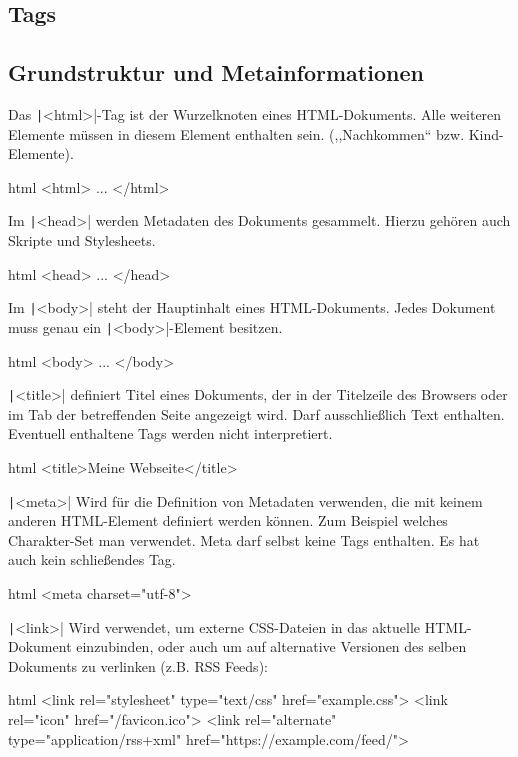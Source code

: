 \documentclass[10pt,a4paper]{article}
\begin{document}
\begin{multicols}{3}
\section*{Tags}
\subsection*{Grundstruktur und Metainformationen}
Das \texttt|<html>|-Tag ist der Wurzelknoten eines HTML-Dokuments. Alle weiteren Elemente müssen in diesem Element enthalten sein. (,,Nachkommen`` bzw. Kind-Elemente).
\begin{codebox}{html}{}
<html> ... </html>
\end{codebox}

Im \texttt|<head>| werden Metadaten des Dokuments gesammelt. Hierzu gehören auch Skripte und Stylesheets.
\begin{codebox}{html}{}
<head> ... </head>
\end{codebox}

Im \texttt|<body>| steht der Hauptinhalt eines HTML-Dokuments. Jedes Dokument muss genau ein \texttt|<body>|-Element besitzen.
\begin{codebox}{html}{}
<body> ... </body>
\end{codebox}

\texttt|<title>| definiert Titel eines Dokuments, der in der Titelzeile des Browsers oder im Tab der betreffenden Seite angezeigt wird. Darf ausschließlich Text enthalten. Eventuell enthaltene Tags werden nicht interpretiert.
\begin{codebox}{html}{}
<title>Meine Webseite</title>
\end{codebox}

\texttt|<meta>| Wird für die Definition von Metadaten verwenden, die mit keinem anderen HTML-Element definiert werden können. Zum Beispiel welches Charakter-Set man verwendet. Meta darf selbst keine Tags enthalten. Es hat auch kein schließendes Tag.
\begin{codebox}{html}{}
<meta charset="utf-8">
\end{codebox}

\texttt|<link>| Wird verwendet, um externe CSS-Dateien in das aktuelle HTML-Dokument einzubinden, oder auch um auf alternative Versionen des selben Dokuments zu verlinken (z.B. RSS Feeds):
\begin{codebox}{html}{}
<link rel="stylesheet" type="text/css" href="example.css">
<link rel="icon" href="/favicon.ico">
<link rel="alternate" type="application/rss+xml" href="https://example.com/feed/">
\end{codebox}


\end{multicols}
\end{document}
